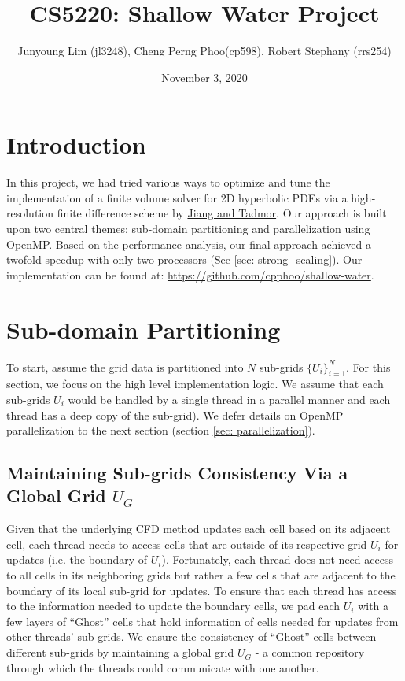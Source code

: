 \documentclass{article}
\title{CS5220: Shallow Water Project}
\author{Junyoung Lim (jl3248), Cheng Perng Phoo(cp598), Robert Stephany (rrs254)}
\date{November 3, 2020}
\begin{document}
\maketitle

\section{Introduction}

In this project, we had tried various ways to optimize and tune the implementation of a finite volume solver for 2D hyperbolic PDEs 
via a high-resolution finite difference scheme by \href{http://www.cscamm.umd.edu/tadmor/pub/central-schemes/Jiang-Tadmor.SISSC-98.pdf}{Jiang and Tadmor}.
Our approach is built upon two central themes: sub-domain partitioning and parallelization using OpenMP. 
Based on the performance analysis, our final approach achieved a twofold speedup with only two processors (See \ref{sec: strong_scaling}). 
Our implementation can be found at: \url{https://github.com/cpphoo/shallow-water}.

\section{Sub-domain Partitioning}
\label{sec: subdomain_partitioning}
To start, assume the grid data is partitioned into $N$ sub-grids $\{U_i\}_{i=1}^N$.
For this section, we focus on the high level implementation logic. We assume 
that each sub-grids $U_i$ would be handled by a single thread in a parallel manner and 
each thread has a deep copy of the sub-grid). 
We defer details on OpenMP parallelization to the next section (section \ref{sec: parallelization}). 

\subsection{Maintaining Sub-grids Consistency Via a Global Grid $U_G$}

Given that the underlying CFD method updates each cell based on its adjacent cell, each thread needs to access cells that are outside of its respective grid $U_i$ for updates (i.e. the boundary of $U_i$). 
Fortunately, each thread does not need access to all cells in its neighboring grids but rather a few cells that are adjacent to the boundary of its local sub-grid for updates.
To ensure that each thread has access to the information needed to update the boundary cells, we pad each $U_i$ with a few layers of ``Ghost'' cells that hold information of cells 
needed for updates from other threads' sub-grids. We ensure the consistency of ``Ghost'' cells between different sub-grids by maintaining a global grid $U_G$ - a common repository 
through which the threads could communicate with one another.
\end{document}
